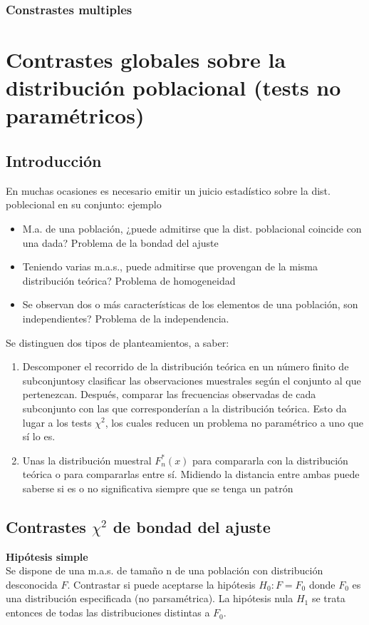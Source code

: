 \documentclass[a4paper,12pt]{article}
\begin{document}
\subsubsection{Constrastes multiples}

\section{Contrastes globales sobre la distribución poblacional (tests no paramétricos)}
\subsection{Introducción}
En muchas ocasiones es necesario emitir un juicio estadístico sobre la dist. poblecional en su conjunto: ejemplo
\begin{itemize}
\item M.a. de una población, ¿puede admitirse que la dist. poblacional coincide con una dada? Problema de la bondad del ajuste
\item Teniendo varias m.a.s., puede admitirse que provengan de la misma distribución teórica? Problema de homogeneidad
\item Se observan dos o más características de los elementos de una población, son independientes? Problema de la independencia.
\end{itemize}

Se distinguen dos tipos de planteamientos, a saber:
\begin{enumerate}
\item Descomponer el recorrido de la distribución teórica en un número finito de subconjuntosy clasificar las observaciones muestrales según el conjunto al que pertenezcan. Después, comparar las frecuencias observadas de cada subconjunto con las que corresponderían a la distribución teórica. Esto da lugar a los tests $\chi^2$, los cuales reducen un problema no paramétrico a uno que sí lo es.
\item Unas la distribución muestral $F^*_n(x)$ para compararla con la distribución teórica o para compararlas entre sí. Midiendo la distancia entre ambas puede saberse si es o no significativa siempre que se tenga un patrón
\end{enumerate}

\subsection{Contrastes $\chi^2$ de bondad del ajuste}
\textbf{Hipótesis simple} \\
Se dispone de una m.a.s. de tamaño n de una población con distribución desconocida $F$. Contrastar si puede aceptarse la hipótesis $H_0 : F = F_0$ donde $F_0$ es una distribución especificada (no parsamétrica). La hipótesis nula $H_1$ se trata entonces de todas las distribuciones distintas a $F_0$.
\end{document}
